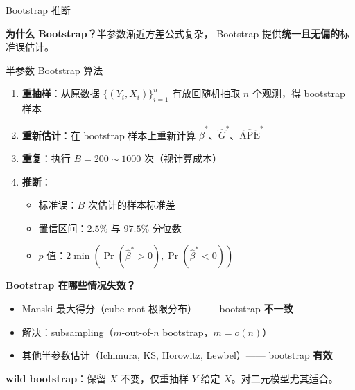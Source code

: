 \documentclass[aspectratio=169, 10pt]{beamer}
\begin{document}
\begin{frame}[shrink=8]{Bootstrap 推断}

  \textbf{为什么 Bootstrap？}半参数渐近方差公式复杂，
  Bootstrap 提供\textbf{统一且无偏的}标准误估计。

  \begin{definitionbox}{{半参数 Bootstrap 算法}}
    \begin{enumerate}\setlength{\itemsep}{1pt}
      \item \textbf{重抽样}：从原数据 $\{(Y_i, X_i)\}_{i=1}^n$ 有放回随机抽取 $n$ 个观测，得 bootstrap 样本
      \item \textbf{重新估计}：在 bootstrap 样本上重新计算 $\hat\beta^{*}$、$\hat G^{*}$、$\widehat{\text{APE}}^{*}$
      \item \textbf{重复}：执行 $B = 200 \sim 1000$ 次（视计算成本）
      \item \textbf{推断}：
      \begin{itemize}\setlength{\itemsep}{1pt}
        \item 标准误：$B$ 次估计的样本标准差
        \item 置信区间：$2.5\%$ 与 $97.5\%$ 分位数
        \item $p$ 值：$2 \min(\Pr(\hat\beta^{*} > 0), \Pr(\hat\beta^{*} < 0))$
      \end{itemize}
    \end{enumerate}
  \end{definitionbox}

  \begin{highlightbox}
    \textbf{Bootstrap 在哪些情况失效？}
    \begin{itemize}\setlength{\itemsep}{1pt}
      \item Manski 最大得分（cube-root 极限分布）—— bootstrap \textbf{不一致}
      \item 解决：subsampling（$m$-out-of-$n$ bootstrap，$m = o(n)$）
      \item 其他半参数估计（Ichimura, KS, Horowitz, Lewbel）—— bootstrap \textbf{有效}
    \end{itemize}
  \end{highlightbox}

  \begin{keybox}
    \textbf{wild bootstrap}：保留 $X$ 不变，仅重抽样 $Y$ 给定 $X$。对二元模型尤其适合。
  \end{keybox}

\end{frame}

\end{document}
